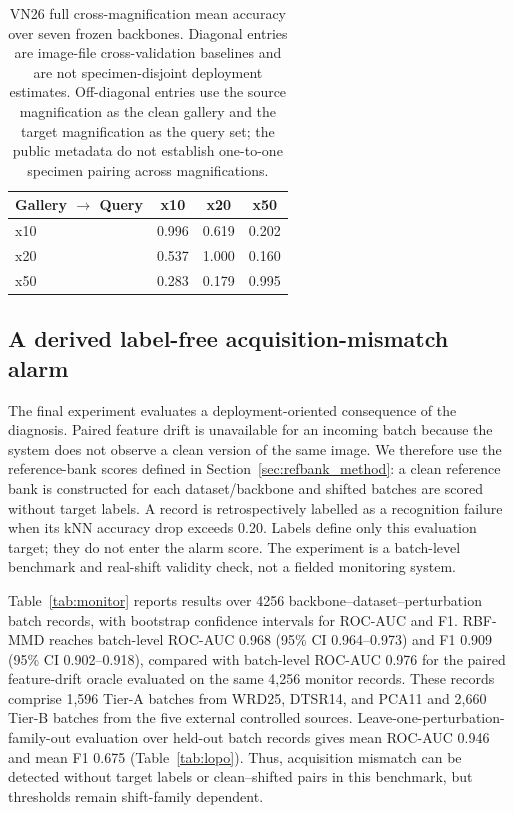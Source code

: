 \documentclass[a4paper,fleqn]{els-cas-templates/cas-sc}
\begin{document}
\begin{table}[pos=htbp]
\centering
\caption{VN26 full cross-magnification mean accuracy over seven frozen
backbones. Diagonal entries are image-file cross-validation baselines and are
not specimen-disjoint deployment estimates. Off-diagonal entries use the source
magnification as the clean gallery and the target magnification as the query
set; the public metadata do not establish one-to-one specimen pairing across
magnifications.}
\label{tab:crossmag}
\begin{tabular}{lccc}
\toprule
Gallery $\rightarrow$ Query & x10 & x20 & x50 \\
\midrule
x10 & 0.996 & 0.619 & 0.202 \\
x20 & 0.537 & 1.000 & 0.160 \\
x50 & 0.283 & 0.179 & 0.995 \\
\bottomrule
\end{tabular}
\end{table}

\subsection{A derived label-free acquisition-mismatch alarm}
\label{sec:refbank_results}

The final experiment evaluates a deployment-oriented consequence of the
diagnosis. Paired feature drift is unavailable for an incoming batch because the
system does not observe a clean version of the same image. We therefore use the
reference-bank scores defined in Section~\ref{sec:refbank_method}: a clean
reference bank is constructed for each dataset/backbone and shifted batches are
scored without target labels. A record is retrospectively labelled as a
recognition failure when its kNN accuracy drop exceeds 0.20. Labels define only this
evaluation target; they do not enter the alarm score. The experiment is a
batch-level benchmark and real-shift validity check, not a fielded monitoring
system.

Table~\ref{tab:monitor} reports results over 4256
backbone--dataset--perturbation batch records, with bootstrap confidence
intervals for ROC-AUC and F1. RBF-MMD reaches batch-level ROC-AUC 0.968
(95\% CI 0.964--0.973) and F1 0.909 (95\% CI 0.902--0.918), compared with
batch-level ROC-AUC 0.976 for the paired feature-drift oracle evaluated on the
same 4,256 monitor records.
These records comprise 1,596 Tier-A batches from WRD25, DTSR14, and PCA11 and
2,660 Tier-B batches from the five external controlled sources.
Leave-one-perturbation-family-out evaluation over held-out batch records gives
mean ROC-AUC 0.946 and mean F1 0.675 (Table~\ref{tab:lopo}). Thus, acquisition mismatch can
be detected without target labels or clean--shifted pairs in this benchmark, but
thresholds remain shift-family dependent.
\end{document}
